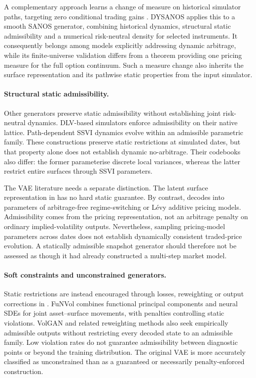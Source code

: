 A complementary approach learns a change of measure on historical simulator paths, targeting zero conditional trading gains \cite{removedrift}. DYSANOS \cite{dysanos} applies this to a smooth SANOS generator, combining historical dynamics, structural static admissibility and a numerical risk-neutral density for selected instruments. It consequently belongs among models explicitly addressing dynamic arbitrage, while its finite-universe validation differs from a theorem providing one pricing measure for the full option continuum. Such a measure change also inherits the surface representation and its pathwise static properties from the input simulator.

\paragraph{Structural static admissibility.}
Other generators preserve static admissibility without establishing joint risk-neutral dynamics. DLV-based simulators \cite{wiese2019,wiese2021} enforce admissibility on their native lattice. Path-dependent SSVI dynamics \cite{andres} evolve within an admissible parametric family. These constructions preserve static restrictions at simulated dates, but that property alone does not establish dynamic no-arbitrage. Their codebooks also differ: the former parameterise discrete local variances, whereas the latter restrict entire surfaces through SSVI parameters.

The VAE literature needs a separate distinction. The latent surface representation in \cite{bergeron} has no hard static guarantee. By contrast, \cite{ning} decodes into parameters of arbitrage-free regime-switching or L\'evy additive pricing models. Admissibility comes from the pricing representation, not an arbitrage penalty on ordinary implied-volatility outputs. Nevertheless, sampling pricing-model parameters across dates does not establish dynamically consistent traded-price evolution. A statically admissible snapshot generator should therefore not be assessed as though it had already constructed a multi-step market model.

\paragraph{Soft constraints and unconstrained generators.}
Static restrictions are instead encouraged through losses, reweighting or output corrections in \cite{zhang,contvuletic,funvol,volgan}. FuNVol combines functional principal components and neural SDEs for joint asset--surface movements, with penalties controlling static violations. VolGAN and related reweighting methods also seek empirically admissible outputs without restricting every decoded state to an admissible family. Low violation rates do not guarantee admissibility between diagnostic points or beyond the training distribution. The original VAE \cite{bergeron} is more accurately classified as unconstrained than as a guaranteed or necessarily penalty-enforced construction.

